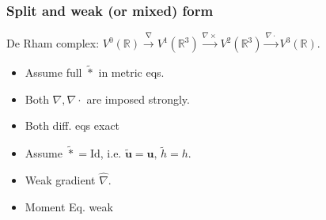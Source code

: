 \documentclass{beamer}
\newcommand{\bbR}{\mathbb{R}}
\begin{document}
\begin{frame}[fragile]\frametitle{Split and weak (or mixed) form}
	De Rham complex: $V^0(\bbR) \xrightarrow{\nabla} V^1(\bbR^3) \xrightarrow{\nabla \times} V^2(\bbR^3) \xrightarrow{\nabla \cdot} V^3(\bbR).$
	\addtolength{\textfloatsep}{-0.8in}
	
	\begin{tcbraster}[raster columns=2, raster equal height]
		\begin{tcolorbox}[width=0.5\textwidth, nobeforeafter, colframe=theme,title=Split form]%
		\begin{itemize}
			\item Assume full $\tilde{*}$ in metric eqs.
			\item Both $\nabla, \nabla \cdot$ are imposed strongly.
			\item Both diff. eqs exact 
		\end{itemize}
		\end{tcolorbox} 
		\begin{tcolorbox}[width=0.5\textwidth, nobeforeafter,  colframe=theme,title=Weak form (Mixed FE)]%
		\begin{itemize}
			\item Assume $\tilde{*}=\text{Id}$, i.e. $\tilde{\bm{u}}=\bm{u}, \, \tilde{h}=h$.
			\item Weak gradient $\widehat{\nabla}$.
			\item Moment Eq. weak
		\end{itemize}
		\end{tcolorbox}
	\end{tcbraster}
	
\end{frame}
\end{document}
